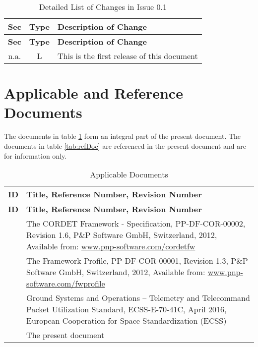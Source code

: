 \documentclass{pnp_article}
\begin{document}
\begin{longtable}{|c|c|p{10cm}|}
\caption{Detailed List of Changes in Issue 0.1} \\
\hline
\rowcolor{light-gray}
\textbf{Sec} & \textbf{Type} & \textbf{Description of Change} \\
\hline\hline
\endfirsthead
\rowcolor{light-gray}
\textbf{Sec} & \textbf{Type} & \textbf{Description of Change} \\
\hline\hline
\endhead
n.a. & L & This is the first release of this document \\
\hline
\end{longtable}






\newpage

\section{Applicable and Reference Documents}

The documents in table \ref{tab:appDoc} form an integral part of the present document. The documents in table \ref{tab:refDoc} are referenced in the present document and are for information only.

\begin{longtable}{|c|p{11cm}|}
\caption{Applicable Documents} \label{tab:appDoc}\\
\hline
\rowcolor{light-gray}
\textbf{ID} & \textbf{Title, Reference Number, Revision Number} \\
\hline\hline
\endfirsthead
\rowcolor{light-gray}
\textbf{ID} & \textbf{Title, Reference Number, Revision Number} \\
\hline\hline
\endhead
[CR-SP] & The CORDET Framework - Specification, PP-DF-COR-00002, Revision 1.6, P\&P Software GmbH, Switzerland, 2012, Available from: \url{www.pnp-software.com/cordetfw} \\
\hline
[FW-SP] & The Framework Profile, PP-DF-COR-00001, Revision 1.3, P\&P Software GmbH, Switzerland, 2012, Available from: \url{www.pnp-software.com/fwprofile} \\
\hline
[PS-SP] & Ground Systems and Operations – Telemetry and Telecommand Packet Utilization Standard, ECSS-E-70-41C, April 2016, European Cooperation for Space Standardization (ECSS) \\
\hline
[PX-SP] & The present document \\
\hline
\end{longtable}
\end{document}
